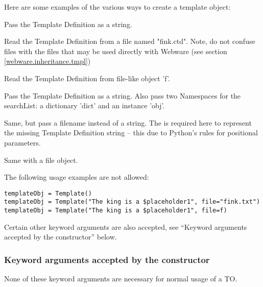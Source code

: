 Here are some examples of the various ways to create a template object:
\begin{description}
\item{}
     Pass the Template Definition as a string.
\item{}
     Read the Template Definition from a file named "fink.ctd".  Note, do not
     confuse  files with the  files that may be used
     directly with Webware (see section \ref{webware.inheritance.tmpl})
\item{}
     Read the Template Definition from file-like object 'f'.
\item{}
     Pass the Template Definition as a string.  Also pass two Namespaces for the
     searchList: a dictionary 'dict' and an instance 'obj'.
\item{}
     Same, but pass a filename instead of a string.  The  is required
     here to represent the missing Template Definition string -- this due to
     Python's rules for positional parameters.
\item{}
     Same with a file object.
\end{description}

The following usage examples are not allowed:
\begin{verbatim}
templateObj = Template() 
templateObj = Template("The king is a $placeholder1", file="fink.txt")
templateObj = Template("The king is a $placeholder1", file=f)
\end{verbatim}

Certain other keyword arguments are also accepted, see 
``Keyword arguments accepted by the constructor'' below.

\subsubsection{Keyword arguments accepted by the constructor}

None of these keyword arguments are necessary for normal usage of a TO.

